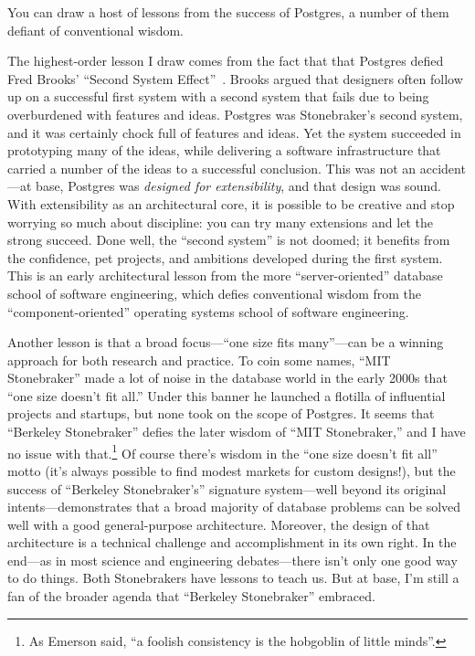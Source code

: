 \documentclass[sigconf,natbib=false]{acmart}
\begin{document}
You can draw a host of lessons from the success of Postgres, a number of them defiant of conventional wisdom. 

The highest-order lesson I draw comes from the fact that that Postgres defied Fred Brooks' ``Second System Effect''~\cite{brooks1975mythical}. Brooks argued that designers often follow up on a successful first system with a second system that fails due to being overburdened with features and ideas. Postgres was Stonebraker's second system, and it was certainly chock full of features and ideas. Yet the system succeeded in prototyping many of the ideas, while delivering a software infrastructure that carried a number of the ideas to a successful conclusion. This was not an accident---at base, Postgres was \textit{designed for extensibility}, and that design was sound. With extensibility as an architectural core, it is possible to be creative and stop worrying so much about discipline: you can try many extensions and let the strong succeed. Done well, the ``second system'' is not doomed; it benefits from the confidence, pet projects, and ambitions developed during the first system. This is an early architectural lesson from the more ``server-oriented'' database school of software engineering, which defies conventional wisdom from the ``component-oriented'' operating systems school of software engineering.

Another lesson is that a broad focus---``one size fits many''---can be a winning approach for both research and practice. To coin some names, ``MIT Stonebraker'' made a lot of noise in the database world in the early 2000s that ``one size doesn't fit all.'' Under this banner he launched a flotilla of influential projects and startups, but none took on the scope of Postgres. It seems that ``Berkeley Stonebraker'' defies the later wisdom of ``MIT Stonebraker,'' and I have no issue with that.\footnote{As Emerson said, ``a foolish consistency is the hobgoblin of little minds''.}  Of course there's wisdom in the ``one size doesn't fit all'' motto (it's always possible to find modest markets for custom designs!), but the success of ``Berkeley Stonebraker's'' signature system---well beyond its original intents---demonstrates that a broad majority of database problems can be solved well with a good general-purpose architecture. Moreover, the design of that architecture is a technical challenge and accomplishment in its own right. In the end---as in most science and engineering debates---there isn't only one good way to do things. Both Stonebrakers have lessons to teach us. But at base, I'm still a fan of the broader agenda that ``Berkeley Stonebraker'' embraced.
\end{document}
